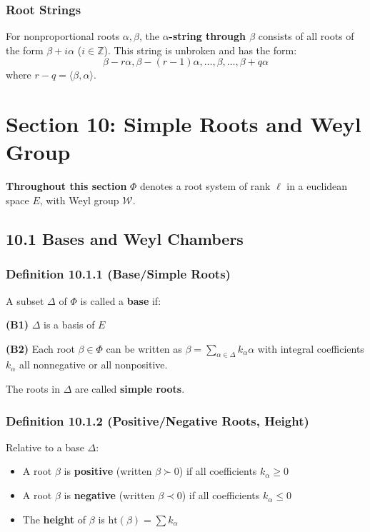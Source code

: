 \subsubsection{Root Strings}

For nonproportional roots $\alpha, \beta$, the \textbf{$\alpha$-string through $\beta$} consists of all roots of the form $\beta + i\alpha$ ($i \in \mathbb{Z}$). This string is unbroken and has the form:
\[
\beta - r\alpha, \beta - (r-1)\alpha, \ldots, \beta, \ldots, \beta + q\alpha
\]
where $r - q = \langle\beta, \alpha\rangle$.


\section{Section 10: Simple Roots and Weyl Group}

\textbf{Throughout this section} $\Phi$ denotes a root system of rank $\ell$ in a euclidean space $E$, with Weyl group $\mathcal{W}$.

\subsection{10.1 Bases and Weyl Chambers}

\subsubsection{Definition 10.1.1 (Base/Simple Roots)}

A subset $\Delta$ of $\Phi$ is called a \textbf{base} if:

\textbf{(B1)} $\Delta$ is a basis of $E$

\textbf{(B2)} Each root $\beta \in \Phi$ can be written as $\beta = \sum_{\alpha \in \Delta} k_\alpha \alpha$ with integral coefficients $k_\alpha$ all nonnegative or all nonpositive.

The roots in $\Delta$ are called \textbf{simple roots}.

\subsubsection{Definition 10.1.2 (Positive/Negative Roots, Height)}

Relative to a base $\Delta$:

\begin{itemize}
	\item A root $\beta$ is \textbf{positive} (written $\beta \succ 0$) if all coefficients $k_\alpha \geq 0$
	\item A root $\beta$ is \textbf{negative} (written $\beta \prec 0$) if all coefficients $k_\alpha \leq 0$
	\item The \textbf{height} of $\beta$ is $\text{ht}(\beta) = \sum k_\alpha$
\end{itemize}

